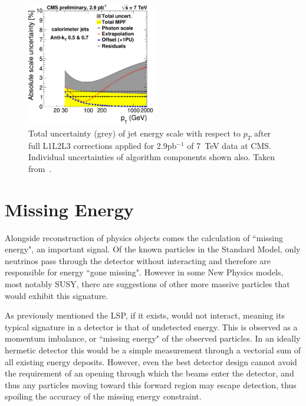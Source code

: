 \begin{figure}
\centering
\includegraphics[width=0.5\textwidth]{Figures/Objects/JESU}
\caption[Total uncertainty (grey) of jet energy scale with respect to $p_{T}$ after full L1L2L3 corrections applied for 2.9\,pb$^{-1}$ of 7~TeV data at CMS. ]{\label{fig:JESU}Total uncertainty (grey) of jet energy scale with respect to $p_{T}$ after full L1L2L3 corrections applied for 2.9pb$^{-1}$ of 7~TeV data at CMS. Individual uncertainties of algorithm components shown also. Taken from~\cite{JME-10-010}.}
\end{figure}

\section{Missing Energy}

Alongside reconstruction of physics objects comes the calculation of ``missing energy", an important signal. Of the known particles in the Standard Model,  only neutrinos pass through the detector without interacting and therefore are responsible for energy ``gone missing". However in some New Physics models, most notably SUSY, there are suggestions of other more massive particles that would exhibit this signature. 
 
As previously mentioned the LSP, if it exists, would not interact, meaning its typical signature in a detector is that of undetected energy. This is observed as a momentum imbalance, or ``missing energy" of the observed particles. In an ideally hermetic detector this would be a simple measurement through a vectorial sum of all existing energy deposits. However, even the best detector design cannot avoid the requirement of an opening through which the beams enter the detector, and thus any particles moving toward this forward region may escape detection, thus spoiling the accuracy of the missing energy constraint. 

